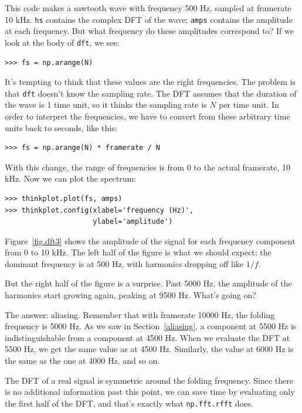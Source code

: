 \documentclass[12pt]{book}
\begin{document}
This code makes a sawtooth wave with frequency 500 Hz, sampled at
framerate 10 kHz.  {\tt hs} contains the complex DFT of the wave;
{\tt amps} contains the amplitude at each frequency.  But what
frequency do these amplitudes correspond to?  If we look at the
body of {\tt dft}, we see:

\begin{verbatim}
>>> fs = np.arange(N)
\end{verbatim}

It's tempting to think that these values are the right frequencies.
The problem is that {\tt dft} doesn't know the sampling rate.  The DFT
assumes that the duration of the wave is 1 time unit, so it thinks the
sampling rate is $N$ per time unit.  In order to interpret the
frequencies, we have to convert from these arbitrary time units back
to seconds, like this:

\begin{verbatim}
>>> fs = np.arange(N) * framerate / N
\end{verbatim}

With this change, the range of frequencies is from 0 to the actual
framerate, 10 kHz.  Now we can plot the spectrum:

\begin{verbatim}
>>> thinkplot.plot(fs, amps)
>>> thinkplot.config(xlabel='frequency (Hz)', 
                     ylabel='amplitude')
\end{verbatim}

Figure~\ref{fig.dft3} shows the amplitude of the signal for each
frequency component from 0 to 10 kHz.  The left half of the figure
is what we should expect: the dominant frequency is at 500 Hz, with
harmonics dropping off like $1/f$.

But the right half of the figure is a surprise.  Past 5000 Hz, the
amplitude of the harmonics start growing again, peaking at 9500 Hz.
What's going on?

The answer: aliasing.  Remember that with framerate 10000 Hz, the
folding frequency is 5000 Hz.  As we saw in Section~\ref{aliasing},
a component at 5500 Hz is indistinguishable from a component
at 4500 Hz.  When we evaluate the DFT at 5500 Hz, we get the same
value as at 4500 Hz.  Similarly, the value at 6000 Hz is the same
as the one at 4000 Hz, and so on.

The DFT of a real signal is symmetric around the folding frequency.
Since there is no additional information past this point, we can
save time by evaluating only the first half of the DFT,
and that's exactly what {\tt np.fft.rfft} does.
\end{document}
